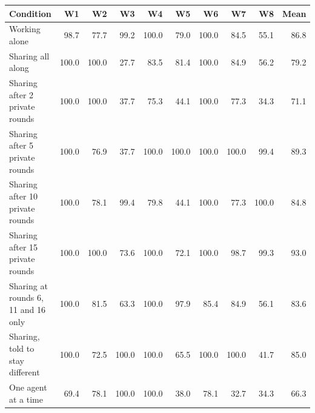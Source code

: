 \begin{tabular}{l rrrrrrrr r}
\toprule
Condition & W1 & W2 & W3 & W4 & W5 & W6 & W7 & W8 & Mean \\
\midrule
Working alone & 98.7 & 77.7 & 99.2 & 100.0 & 79.0 & 100.0 & 84.5 & 55.1 & 86.8 \\
Sharing all along & 100.0 & 100.0 & 27.7 & 83.5 & 81.4 & 100.0 & 84.9 & 56.2 & 79.2 \\
Sharing after 2 private rounds & 100.0 & 100.0 & 37.7 & 75.3 & 44.1 & 100.0 & 77.3 & 34.3 & 71.1 \\
Sharing after 5 private rounds & 100.0 & 76.9 & 37.7 & 100.0 & 100.0 & 100.0 & 100.0 & 99.4 & 89.3 \\
Sharing after 10 private rounds & 100.0 & 78.1 & 99.4 & 79.8 & 44.1 & 100.0 & 77.3 & 100.0 & 84.8 \\
Sharing after 15 private rounds & 100.0 & 100.0 & 73.6 & 100.0 & 72.1 & 100.0 & 98.7 & 99.3 & 93.0 \\
Sharing at rounds 6, 11 and 16 only & 100.0 & 81.5 & 63.3 & 100.0 & 97.9 & 85.4 & 84.9 & 56.1 & 83.6 \\
Sharing, told to stay different & 100.0 & 72.5 & 100.0 & 100.0 & 65.5 & 100.0 & 100.0 & 41.7 & 85.0 \\
One agent at a time & 69.4 & 78.1 & 100.0 & 100.0 & 38.0 & 78.1 & 32.7 & 34.3 & 66.3 \\
\bottomrule
\end{tabular}